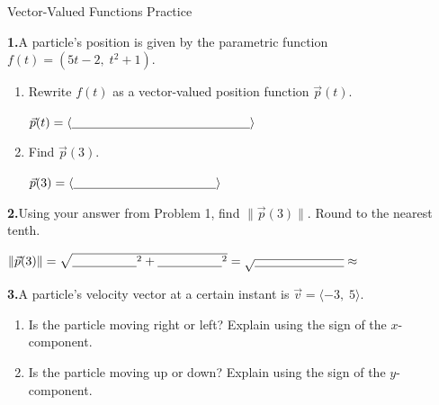 \documentclass[10pt]{article}
\begin{document}
\namedateperiod

\vspace{0.12in}

\begin{notesbox}{Vector-Valued Functions Practice}
\small

\textbf{1.}\quad A particle's position is given by the parametric function
$f(t)=(5t-2,\;t^{2}+1)$.

\begin{enumerate}[label=(\alph*)]
  \item Rewrite $f(t)$ as a vector-valued position function $\vec{p}(t)$.

  \vspace{0.06in}
  \hspace{1em} $\vec{p}(t) = \langle \blank{5cm}\rangle$

  \vspace{0.1in}
  \item Find $\vec{p}(3)$.

  \vspace{0.06in}
  \hspace{1em} $\vec{p}(3) = \langle \blank{4cm}\rangle$
\end{enumerate}

\vspace{0.14in}

\textbf{2.}\quad Using your answer from Problem 1, find $\|\vec{p}(3)\|$.
Round to the nearest tenth.

\vspace{0.06in}
\hspace{1em} $\|\vec{p}(3)\| = \sqrt{\blank{1.8cm}^{2}+\blank{1.8cm}^{2}}
= \sqrt{\blank{2.5cm}} \approx $ \blank{2.5cm}

\vspace{0.14in}

\textbf{3.}\quad A particle's velocity vector at a certain instant is
$\vec{v}=\langle -3,\;5\rangle$.

\begin{enumerate}[label=(\alph*)]
  \item Is the particle moving right or left?  Explain using the sign of the
        $x$-component.

  \writeline

  \item Is the particle moving up or down?  Explain using the sign of the
        $y$-component.

  \writeline
\end{enumerate}


\end{notesbox}
\end{document}
